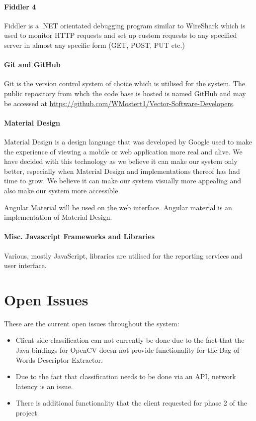 \documentclass[11pt,a4paper,titlepage]{article}
\begin{document}
		\paragraph{Fiddler 4}
			Fiddler is a .NET orientated debugging program similar to WireShark which is used to monitor HTTP requests and set up custom requests to any specified server in almost any specific form (GET, POST, PUT etc.)
		\paragraph{Git and GitHub}
			Git is the version control system of choice which is utilised for the system. The public repository from whch the code base is hosted is named GitHub and may be accessed at \url{https://github.com/WMostert1/Vector-Software-Developers}.
		\paragraph{Material Design}
			Material Design is a design language that was developed by Google used to make the experience of viewing a mobile or web application more real and alive. We have decided with this technology as we believe it can make our system only better, especially when Material Design and implementations thereof has had time to grow. We believe it can make our system visually more appealing and also make our system more accessible.
			
			Angular Material will be used on the web interface. Angular material is an implementation of Material Design.  
		\paragraph{Misc. Javascript Frameworks and Libraries}
			Various, mostly JavaScript, libraries are utilised for the reporting services and user interface.
\section{Open Issues}
These are the current open issues throughout the system:
\begin{itemize}
	\item Client side classification can not currently be done due to the fact that the Java bindings for OpenCV doesn not provide functionality for the Bag of Words Descriptor Extractor.
	\item Due to the fact that classification needs to be done via an API, network latency is an issue.
	\item There is additional functionality that the client requested for phase 2 of the project.
\end{itemize}

%  
\end{document}

